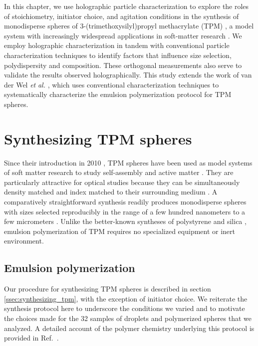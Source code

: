
In this chapter, we use holographic particle characterization
to explore the roles of stoichiometry, initiator choice, and
agitation conditions in the synthesis of monodisperse spheres of
3-(trimethoxysilyl)propyl methacrylate (TPM) \cite{vanderwel17},
a model system with increasingly widespread applications
in soft-matter research \cite{sacanna11,liu16,vanderwel18}.
We employ holographic characterization
in tandem with conventional particle characterization
techniques to identify factors that influence size selection, polydispersity
and composition.
These orthogonal measurements also serve to validate the results observed
holographically.
This study extends the work of van der Wel \emph{et} \emph{al.} \cite{vanderwel17}, which
uses conventional characterization techniques to systematically
characterize the emulsion polymerization protocol for TPM spheres.

\section{Synthesizing TPM spheres}

Since their introduction in 2010 \cite{sacanna10}, TPM spheres have been used as
model systems of soft matter research to
study self-assembly \cite{sacanna13} and active matter \cite{palacci13}.
They are particularly attractive for optical studies because they can be
simultaneously density matched and index matched to their surrounding
medium \cite{liu16}.
A comparatively straightforward synthesis readily produces monodisperse spheres
with sizes selected reproducibly in the range of a few hundred nanometers to a
few micrometers \cite{liu16}.
Unlike the better-known syntheses of polystyrene \cite{goodwin1974} and
silica \cite{stober68},
emulsion polymerization of TPM requires no specialized equipment or
inert environment.

\subsection{Emulsion polymerization}
\label{ssec:polymerization}

Our procedure for synthesizing TPM spheres is described in section
\ref{ssec:synthesizing_tpm}, with the
exception of initiator choice. We reiterate the synthesis protocol
here to underscore the conditions we varied and to motivate the choices
made for the
\num{32} samples of droplets and polymerized spheres that we analyzed.
A detailed account of the polymer chemistry underlying this
protocol is provided in Ref.~\cite{vanderwel17}.

